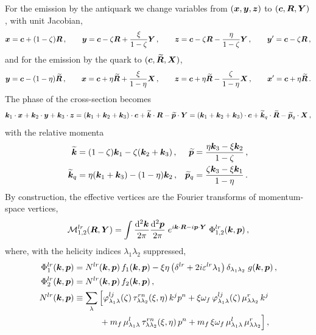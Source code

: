 For the emission by the antiquark we change variables from $(\bm{x},\bm{y},\bm{z})$ to $(\bm{c},\bm{R},\bm{Y})$, with unit
Jacobian,
\begin{equation}
\bm{x}=\bm{c}+(1-\zeta)\bm{R}\,,\qquad\bm{y}=\bm{c}-\zeta\bm{R}+\frac{\xi}{1-\zeta}\bm{Y}\,,\qquad
\bm{z}=\bm{c}-\zeta\bm{R}-\frac{\eta}{1-\zeta}\bm{Y}\,,\qquad\bm{y}'=\bm{c}-\zeta\bm{R}\,,
\label{eq:var-qbar}
\end{equation}
and for the emission by the quark to $(\bm{c},\widetilde{\bm{R}},\bm{X})$,
\begin{equation}
\bm{y}=\bm{c}-(1-\eta)\widetilde{\bm{R}}\,,\qquad\bm{x}=\bm{c}+\eta\widetilde{\bm{R}}+\frac{\xi}{1-\eta}\bm{X}\,,\qquad
\bm{z}=\bm{c}+\eta\widetilde{\bm{R}}-\frac{\zeta}{1-\eta}\bm{X}\,,\qquad\bm{x}'=\bm{c}+\eta\widetilde{\bm{R}}\,.
\label{eq:var-q}
\end{equation}
The phase of the cross-section becomes
\begin{equation}
\bm{k}_1\cdot\bm{x}+\bm{k}_2\cdot\bm{y}+\bm{k}_3\cdot\bm{z}=(\bm{k}_1+\bm{k}_2+\bm{k}_3)\cdot\bm{c}+\widetilde{\bm{k}}\cdot\bm{R}-\widetilde{\bm{p}}\cdot\bm{Y}
=(\bm{k}_1+\bm{k}_2+\bm{k}_3)\cdot\bm{c}+\widetilde{\bm{k}}_q\cdot\widetilde{\bm{R}}-\widetilde{\bm{p}}_q\cdot\bm{X}\,,
\end{equation}
with the relative momenta
\begin{align}
\widetilde{\bm{k}}&=(1-\zeta)\bm{k}_1-\zeta(\bm{k}_2+\bm{k}_3)\,,&\widetilde{\bm{p}}&=\frac{\eta\bm{k}_3-\xi\bm{k}_2}{1-\zeta}\,,
\nonumber\\
\widetilde{\bm{k}}_q&=\eta(\bm{k}_1+\bm{k}_3)-(1-\eta)\bm{k}_2\,,&\widetilde{\bm{p}}_q&=\frac{\zeta\bm{k}_3-\xi\bm{k}_1}{1-\eta}\,.
\label{eq:relmom}
\end{align}
By construction, the effective vertices are the Fourier transforms of momentum-space vertices,
\begin{equation}
\mathcal{M}^{lr}_{1,2}(\bm{R},\bm{Y})=\int\frac{{\rm d}^2\bm{k}}{2\pi}\frac{{\rm d}^2\bm{p}}{2\pi}\;e^{i\bm{k}\cdot\bm{R}-i\bm{p}\cdot\bm{Y}}\;
\Phi^{lr}_{1,2}(\bm{k},\bm{p})\,,
\end{equation}
where, with the helicity indices $\lambda_1\lambda_2$ suppressed,
\begin{align}
\Phi^{lr}_1(\bm{k},\bm{p})&=N^{lr}(\bm{k},\bm{p})\,f_1(\bm{k},\bm{p})
-\xi\eta\,\big(\delta^{lr}+2i\varepsilon^{lr}\lambda_1\big)\,\delta_{\lambda_1\lambda_2}\;g(\bm{k},\bm{p})\,,
\nonumber\\
\Phi^{lr}_2(\bm{k},\bm{p})&=N^{lr}(\bm{k},\bm{p})\,f_2(\bm{k},\bm{p})\,,
\nonumber\\
N^{lr}(\bm{k},\bm{p})&\equiv\sum_\lambda\Big[\varphi^{lj}_{\lambda_1\lambda}(\zeta)\,\tau^{rn}_{\lambda\lambda_2}(\xi,\eta)\,k^jp^n
+\xi\omega_f\,\varphi^{lj}_{\lambda_1\lambda}(\zeta)\,\mu^r_{\lambda\lambda_2}\,k^j
\nonumber\\
&\qquad\quad+m_f\,\mu^l_{\lambda_1\lambda}\,\tau^{rn}_{\lambda\lambda_2}(\xi,\eta)\,p^n
+m_f\,\xi\omega_f\,\mu^l_{\lambda_1\lambda}\,\mu^r_{\lambda\lambda_2}\Big]\,,
\label{eq:Phi}
\end{align}

